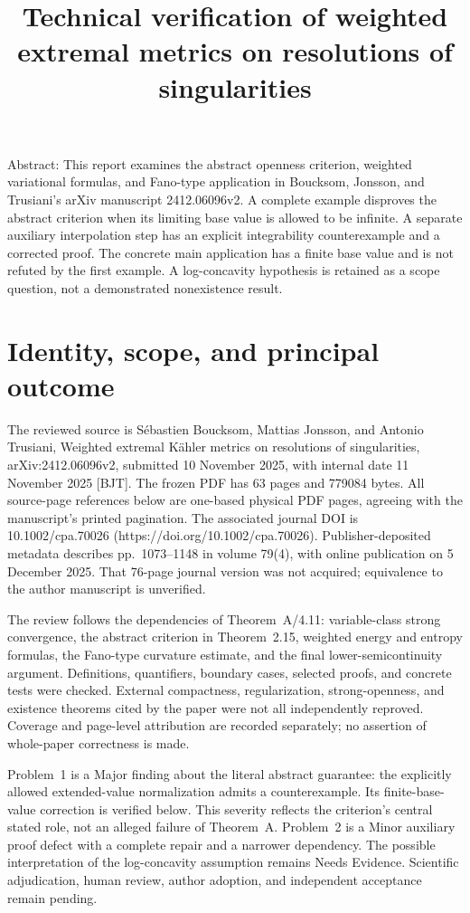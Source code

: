\documentclass[10pt]{article}
\title{Technical verification of weighted extremal metrics
on resolutions of singularities}
\author{}
\date{}
\begin{document}
\maketitle
Abstract: This report examines the abstract openness criterion, weighted variational formulas, and Fano-type application in Boucksom, Jonsson, and Trusiani’s arXiv manuscript 2412.06096v2. A complete example disproves the abstract criterion when its limiting base value is allowed to be infinite. A separate auxiliary interpolation step has an explicit integrability counterexample and a corrected proof. The concrete main application has a finite base value and is not refuted by the first example. A log-concavity hypothesis is retained as a scope question, not a demonstrated nonexistence result.\par
\section*{Identity, scope, and principal outcome}
The reviewed source is Sébastien Boucksom, Mattias Jonsson, and Antonio Trusiani, Weighted extremal Kähler metrics on resolutions of singularities, arXiv:2412.06096v2, submitted 10 November 2025, with internal date 11 November 2025 [BJT]. The frozen PDF has 63 pages and 779084 bytes. All source-page references below are one-based physical PDF pages, agreeing with the manuscript’s printed pagination. The associated journal DOI is 10.1002/cpa.70026 (https://doi.org/10.1002/cpa.70026). Publisher-deposited metadata describes pp. 1073–1148 in volume 79(4), with online publication on 5 December 2025. That 76-page journal version was not acquired; equivalence to the author manuscript is unverified.\par
The review follows the dependencies of Theorem A/4.11: variable-class strong convergence, the abstract criterion in Theorem 2.15, weighted energy and entropy formulas, the Fano-type curvature estimate, and the final lower-semicontinuity argument. Definitions, quantifiers, boundary cases, selected proofs, and concrete tests were checked. External compactness, regularization, strong-openness, and existence theorems cited by the paper were not all independently reproved. Coverage and page-level attribution are recorded separately; no assertion of whole-paper correctness is made.\par
Problem 1 is a Major finding about the literal abstract guarantee: the explicitly allowed extended-value normalization admits a counterexample. Its finite-base-value correction is verified below. This severity reflects the criterion’s central stated role, not an alleged failure of Theorem A. Problem 2 is a Minor auxiliary proof defect with a complete repair and a narrower dependency. The possible interpretation of the log-concavity assumption remains Needs Evidence. Scientific adjudication, human review, author adoption, and independent acceptance remain pending.\par
\end{document}
